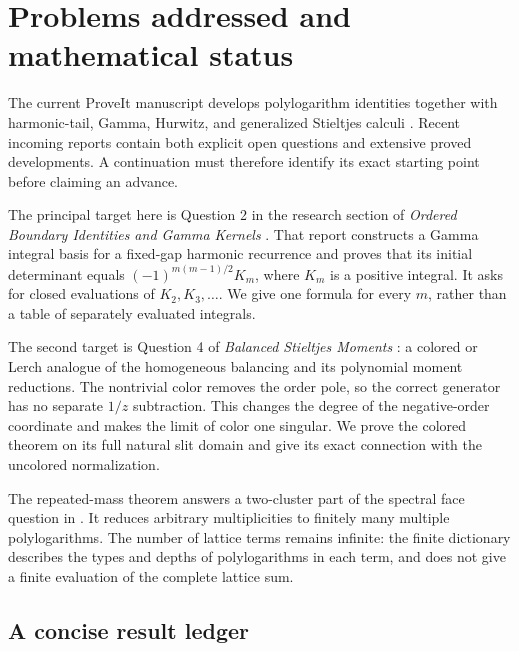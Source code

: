 \section{Problems addressed and mathematical status}
\label{sec:scope}

The current ProveIt manuscript develops polylogarithm identities
together with harmonic-tail, Gamma, Hurwitz, and generalized Stieltjes
calculi \cite{repo}. Recent incoming reports contain both explicit open
questions and extensive proved developments. A continuation must therefore
identify its exact starting point before claiming an advance.

The principal target here is Question 2 in the research section of
\emph{Ordered Boundary Identities and Gamma Kernels} \cite{repoordered}.
That report constructs a Gamma integral basis for a fixed-gap harmonic
recurrence and proves that its initial determinant equals
$(-1)^{m(m-1)/2}K_m$, where $K_m$ is a positive integral. It asks for
closed evaluations of $K_2,K_3,\ldots$. We give one formula for every
$m$, rather than a table of separately evaluated integrals.

The second target is Question 4 of \emph{Balanced Stieltjes Moments}
\cite{repobalanced}: a colored or Lerch analogue of the homogeneous
balancing and its polynomial moment reductions. The nontrivial color
removes the order pole, so the correct generator has no separate
$1/z$ subtraction. This changes the degree of the negative-order
coordinate and makes the limit of color one singular. We prove the
colored theorem on its full natural slit domain and give its exact
connection with the uncolored normalization.

The repeated-mass theorem answers a two-cluster part of the spectral
face question in \cite{repolattice}. It reduces arbitrary multiplicities
to finitely many multiple polylogarithms. The number of lattice terms
remains infinite: the finite dictionary describes the types and depths
of polylogarithms in each term, and does not give a finite evaluation
of the complete lattice sum.

\subsection{A concise result ledger}

